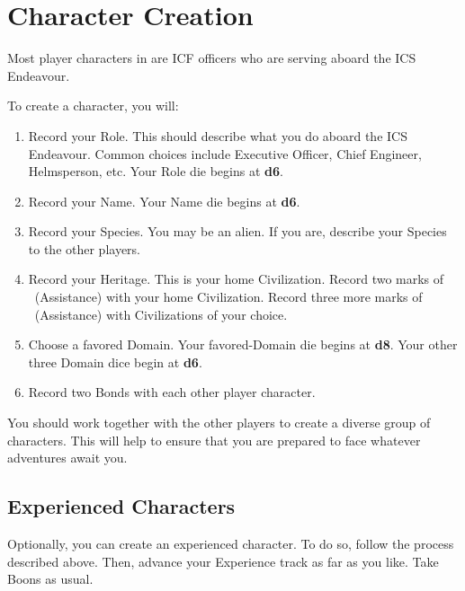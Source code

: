 \documentclass[11pt, a5paper, parskip=half-, DIV=12]{scrartcl}
\begin{document}
\newpage

\ClearShipoutPicture



\section*{Character Creation}
Most player characters in \ENDEAVOUR{} are ICF officers who are serving aboard the ICS Endeavour.

To create a character, you will:
\begin{enumerate}
	\item Record your Role. This should describe what you do aboard the ICS Endeavour. Common choices include Executive Officer, Chief Engineer, Helmsperson, etc.  Your Role die begins at \textbf{d6}.
	\item Record your Name. Your Name die begins at \textbf{d6}.
	\item Record your Species. You may be an alien. If you are, describe your Species to the other players.
	\item Record your Heritage. This is your home Civilization. Record two marks of ~(Assistance) with your home Civilization. Record three more marks of ~(Assistance) with Civilizations of your choice.
	\item Choose a favored Domain. Your favored-Domain die begins at \textbf{d8}. Your other three Domain dice begin at \textbf{d6}.
	\item Record two Bonds with each other player character.
\end{enumerate}
You should work together with the other players to create a diverse group of characters.  This will help to ensure that you are prepared to face whatever adventures await you.

\subsection*{Experienced Characters}
Optionally, you can create an experienced character. To do so, follow the process described above. Then, advance your Experience track as far as you like. Take Boons as usual.
\end{document}
